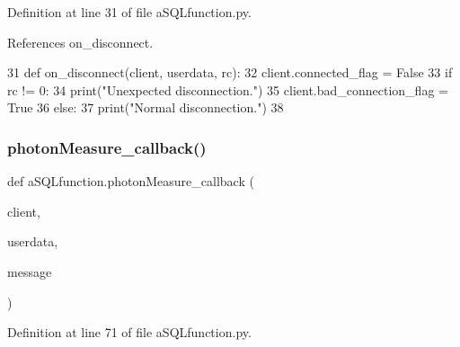 Definition at line 31 of file a\+S\+Q\+Lfunction.\+py.



References on\+\_\+disconnect.


\begin{DoxyCode}
31 \textcolor{keyword}{def }on_disconnect(client, userdata, rc):
32     client.connected\_flag = \textcolor{keyword}{False}
33     \textcolor{keywordflow}{if} rc != 0:
34         print(\textcolor{stringliteral}{"Unexpected disconnection."})
35         client.bad\_connection\_flag = \textcolor{keyword}{True}
36     \textcolor{keywordflow}{else}:
37         print(\textcolor{stringliteral}{"Normal disconnection."})
38 
\end{DoxyCode}
\mbox{\label{namespacea_s_q_lfunction_a5e6d69ade03ee6bf5d9db95907f63725}} 
\subsubsection{photon\+Measure\+\_\+callback()}
{\footnotesize\ttfamily def a\+S\+Q\+Lfunction.\+photon\+Measure\+\_\+callback (\begin{DoxyParamCaption}\item[{}]{client,  }\item[{}]{userdata,  }\item[{}]{message }\end{DoxyParamCaption})}



Definition at line 71 of file a\+S\+Q\+Lfunction.\+py.


